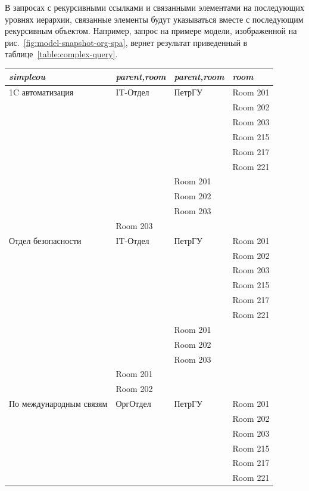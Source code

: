 В запросах с рекурсивными ссылками и связанными элементами на 
последующих уровнях иерархии, связанные элементы будут указываться вместе
с последующим рекурсивным объектом. Например, запрос
на примере модели, изображенной на рис.~\ref{fig:model-snapshot-org-spa}, 
вернет результат приведенный в таблице~\ref{table:complex-query}.
\begin{table}[p]
  \centering
    \begin{tabular}{|l|l|l|l|}
	\hline
	\it{simpleou} & \it{parent,room} & \it{parent,room} & \it{room} \\[5pt]
	\hline
	\hline
	1C автоматизация & IT-Отдел & ПетрГУ & Room 201\\
	\cline{4-4}
		    &  &  & Room 202\\
	\cline{4-4}
		    &  &  & Room 203\\
	\cline{4-4}
		    &  &  & Room 215\\
	\cline{4-4}
		    &  &  & Room 217\\
	\cline{4-4}
		    &  &  & Room 221\\
	\cline{3-4}
		    &  & Room 201 & \\
	\cline{3-4}
		    &  & Room 202 & \\
	\cline{3-4}
		    &  & Room 203 & \\
	\cline{2-4}
		    & Room 203 & & \\
	\hline
	Отдел безопасности & IT-Отдел & ПетрГУ & Room 201\\
	\cline{4-4}
		    &  &  & Room 202\\
	\cline{4-4}
		    &  &  & Room 203\\
	\cline{4-4}
		    &  &  & Room 215\\
	\cline{4-4}
		    &  &  & Room 217\\
	\cline{4-4}
		    &  &  & Room 221\\
	\cline{3-4}
		    &  & Room 201 & \\
	\cline{3-4}
		    &  & Room 202 & \\
	\cline{3-4}
		    &  & Room 203 & \\
	\cline{2-4}
		    & Room 201 & & \\
	\cline{2-4}
		    & Room 202 & & \\
	\hline
	По международным связям & ОргОтдел & ПетрГУ & Room 201\\
	\cline{4-4}
		    &  &  & Room 202\\
	\cline{4-4}
		    &  &  & Room 203\\
	\cline{4-4}
		    &  &  & Room 215\\
	\cline{4-4}
		    &  &  & Room 217\\
	\cline{4-4}
		    &  &  & Room 221\\


\end{tabular}
\end{table}

